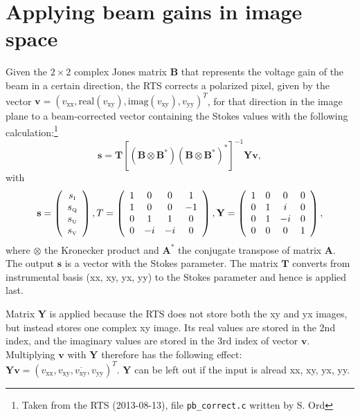 \documentclass[a4paper,11pt]{article}
\begin{document}
\section{Applying beam gains in image space}
Given the $2\times 2$ complex Jones matrix $\mathbf{B}$ that represents the voltage gain of the beam in a certain direction, the RTS corrects a polarized pixel, given by the vector $\textbf{v} = \left(v_\textrm{xx}, \textrm{real}(v_\textrm{xy}), \textrm{imag}(v_\textrm{xy}), v_\textrm{yy} \right)^T$, for that direction in the image plane to a beam-corrected vector containing the Stokes values with the following calculation:\footnote{Taken from the RTS (2013-08-13), file \texttt{pb\_correct.c} written by S. Ord}
\begin{equation} \label{apply-beam-image-space}
 \textbf{s} =
\mathbf{T} \left[ \left(\mathbf{B} \otimes \mathbf{B}^* \right) \left(\mathbf{B} \otimes \mathbf{B}^* \right)^*\right]^{-1} \mathbf{Y} \textbf{v},
\end{equation}
with
\begin{equation}
\textbf{s} = \left( \begin{array}{c}
s_\textrm{\tiny{I}} \\
s_\textrm{\tiny{Q}} \\
s_\textrm{\tiny{U}} \\
s_\textrm{\tiny{V}} \end{array} \right),
T = \left( \begin{array}{cccc}
1 & 0 & 0 & 1 \\
1 & 0 & 0 & -1 \\
0 & 1 & 1 & 0 \\
0 & -i & -i & 0 \end{array} \right), \mathbf{Y} = \left( \begin{array}{cccc}
1 & 0 & 0 & 0 \\
0 & 1 & i & 0 \\
0 & 1 & -i & 0 \\
0 & 0 & 0 & 1
\end{array} \right),
\end{equation}
where $\otimes$ the Kronecker product and $\mathbf{A}^*$ the conjugate transpose of matrix $\mathbf{A}$. The output $\textbf{s}$ is a vector with the Stokes parameter. The matrix $\mathbf{T}$ converts from instrumental basis (xx, xy, yx, yy) to the Stokes parameter and hence is applied last.

Matrix $\mathbf{Y}$ is applied because the RTS does not store both the xy and yx images, but instead stores one complex xy image. Its real values are stored in the 2nd index, and the imaginary values are stored in the 3rd index of vector $\textbf{v}$. Multiplying $\mathbf{v}$ with $\mathbf{Y}$ therefore has the following effect: $\mathbf{Y}\textbf{v} = \left(v_\textrm{xx},v_\textrm{xy}, \overline{v_\textrm{xy}},v_\textrm{yy}\right)^T$. $\mathbf{Y}$ can be left out if the input is alread xx, xy, yx, yy.
\end{document}
